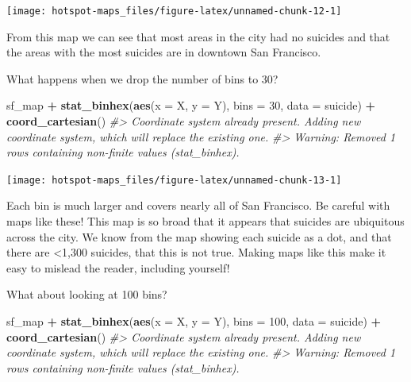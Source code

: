 \documentclass[
  12pt,
]{book}
\newenvironment{Shaded}{\begin{snugshade}}{\end{snugshade}}
\newcommand{\CommentTok}[1]{\textcolor[rgb]{0.56,0.35,0.01}{\textit{#1}}}
\newcommand{\DataTypeTok}[1]{\textcolor[rgb]{0.13,0.29,0.53}{#1}}
\newcommand{\DecValTok}[1]{\textcolor[rgb]{0.00,0.00,0.81}{#1}}
\newcommand{\KeywordTok}[1]{\textcolor[rgb]{0.13,0.29,0.53}{\textbf{#1}}}
\newcommand{\NormalTok}[1]{#1}
\newcommand{\OperatorTok}[1]{\textcolor[rgb]{0.81,0.36,0.00}{\textbf{#1}}}
\newcommand{\StringTok}[1]{\textcolor[rgb]{0.31,0.60,0.02}{#1}}
\begin{document}
\begin{center}\texttt{[image: hotspot-maps\_files/figure-latex/unnamed-chunk-12-1]} \end{center}

From this map we can see that most areas in the city had no suicides and that the areas with the most suicides are in downtown San Francisco.

What happens when we drop the number of bins to 30?

\begin{Shaded}
\begin{Highlighting}[]
\NormalTok{sf\_map }\OperatorTok{+}
\StringTok{  }\KeywordTok{stat\_binhex}\NormalTok{(}\KeywordTok{aes}\NormalTok{(}\DataTypeTok{x =}\NormalTok{ X, }\DataTypeTok{y =}\NormalTok{ Y),}
              \DataTypeTok{bins =} \DecValTok{30}\NormalTok{,}
              \DataTypeTok{data =}\NormalTok{ suicide) }\OperatorTok{+}
\StringTok{  }\KeywordTok{coord\_cartesian}\NormalTok{() }
\CommentTok{\#> Coordinate system already present. Adding new coordinate system, which will replace the existing one.}
\CommentTok{\#> Warning: Removed 1 rows containing non{-}finite values (stat\_binhex).}
\end{Highlighting}
\end{Shaded}

\begin{center}\texttt{[image: hotspot-maps\_files/figure-latex/unnamed-chunk-13-1]} \end{center}

Each bin is much larger and covers nearly all of San Francisco. Be careful with maps like these! This map is so broad that it appears that suicides are ubiquitous across the city. We know from the map showing each suicide as a dot, and that there are \textless1,300 suicides, that this is not true. Making maps like this make it easy to mislead the reader, including yourself!

What about looking at 100 bins?

\begin{Shaded}
\begin{Highlighting}[]
\NormalTok{sf\_map }\OperatorTok{+}
\StringTok{  }\KeywordTok{stat\_binhex}\NormalTok{(}\KeywordTok{aes}\NormalTok{(}\DataTypeTok{x =}\NormalTok{ X, }\DataTypeTok{y =}\NormalTok{ Y),}
              \DataTypeTok{bins =} \DecValTok{100}\NormalTok{,}
              \DataTypeTok{data =}\NormalTok{ suicide) }\OperatorTok{+}
\StringTok{  }\KeywordTok{coord\_cartesian}\NormalTok{() }
\CommentTok{\#> Coordinate system already present. Adding new coordinate system, which will replace the existing one.}
\CommentTok{\#> Warning: Removed 1 rows containing non{-}finite values (stat\_binhex).}
\end{Highlighting}
\end{Shaded}
\end{document}
